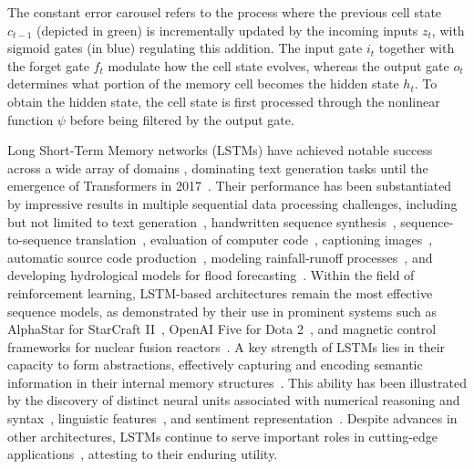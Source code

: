 The constant error carousel refers to the process where the previous cell state $c_{t-1}$ (depicted in green) is incrementally updated by the incoming inputs $z_t$, with sigmoid gates (in blue) regulating this addition. The input gate $i_t$ together with the forget gate $f_t$ modulate how the cell state evolves, whereas the output gate $o_t$ determines what portion of the memory cell becomes the hidden state $h_t$. To obtain the hidden state, the cell state is first processed through the nonlinear function $\psi$ before being filtered by the output gate.

Long Short-Term Memory networks (LSTMs) have achieved notable success across a wide array of domains \citep{Hochreiter:01,Hochreiter:07,Schmidhuber:15}, dominating text generation tasks until the emergence of Transformers in 2017~\citep{Vaswani:17}. Their performance has been substantiated by impressive results in multiple sequential data processing challenges, including but not limited to text generation~\citep{Graves:13,Karpathy:15blog}, handwritten sequence synthesis~\citep{Graves:13}, sequence-to-sequence translation~\citep{Sutskever:14nips}, evaluation of computer code~\citep{Zaremba:14arxiv}, captioning images~\citep{Karpathy:15,Hossain:19}, automatic source code production~\citep{Karpathy:15blog}, modeling rainfall-runoff processes~\citep{Kratzert:18,Kratzert:19}, and developing hydrological models for flood forecasting~\citep{Nearing:24}. Within the field of reinforcement learning, LSTM-based architectures remain the most effective sequence models, as demonstrated by their use in prominent systems such as AlphaStar for StarCraft II~\citep{Vinyals:17short}, OpenAI Five for Dota 2~\citep{OpenAI:19}, and magnetic control frameworks for nuclear fusion reactors~\citep{Degrave:22short}. A key strength of LSTMs lies in their capacity to form abstractions, effectively capturing and encoding semantic information in their internal memory structures~\citep{Karpathy:15blog}. This ability has been illustrated by the discovery of distinct neural units associated with numerical reasoning and syntax~\citep{Lakretz:19}, linguistic features~\citep{Bau:19}, and sentiment representation~\citep{Radford:17arxiv}. Despite advances in other architectures, LSTMs continue to serve important roles in cutting-edge applications~\citep{Degrave:22short,Nearing:24}, attesting to their enduring utility.

